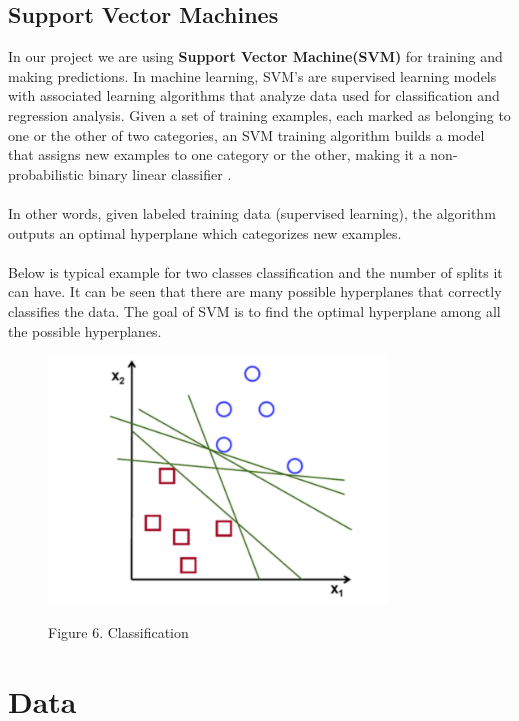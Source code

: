 \documentclass[fleqn,10pt]{SelfArx} %
\begin{document}
\subsection{Support Vector Machines}
In our project we are using \textbf{Support Vector Machine(SVM)} for training and making predictions. In machine learning, SVM's are supervised learning models with associated learning algorithms that analyze data used for classification and regression analysis. Given a set of training examples, each marked as belonging to one or the other of two categories, an SVM training algorithm builds a model that assigns new examples to one category or the other, making it a non-probabilistic binary linear classifier \cite{REF:6}. 
\\\\In other words, given labeled training data (supervised learning), the algorithm outputs an optimal hyperplane which categorizes new examples.
\\\\Below is typical example for two classes classification and the number of splits it can have. It can be seen that there are many possible hyperplanes that correctly classifies the data. The goal of SVM is to find the optimal hyperplane among all the possible hyperplanes.

\begin{center}
\begin{figure}
\begin{minipage}[b]{1.0\linewidth}
  \centering
  \centerline{\includegraphics[width=9cm]{SVM}}
  \centerline{Figure 6. Classification}\medskip
\end{minipage}
\end{figure}
\end{center}

\newpage

\section{Data}
\end{document}
